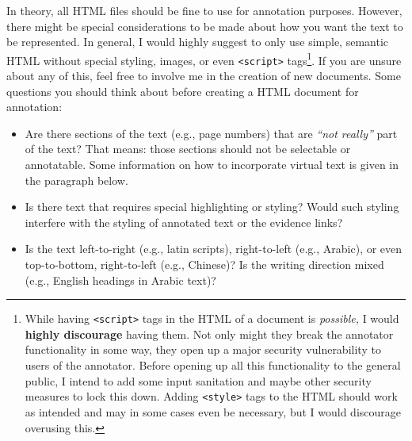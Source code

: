 In theory, all HTML files should be fine to use for annotation purposes.
However, there might be special considerations to be made about how you want the text to be represented.
In general, I would highly suggest to only use simple, semantic HTML without special styling, images, or even \verb!<script>! tags\footnote{
  While having \texttt{<script>} tags in the HTML of a document is \emph{possible,} I would \textbf{highly discourage} having them.
  Not only might they break the annotator functionality in some way, they open up a major security vulnerability to users of the annotator.
  Before opening up all this functionality to the general public, I intend to add some input sanitation and maybe other security measures to lock this down.
  Adding \texttt{<style>} tags to the HTML should work as intended and may in some cases even be necessary, but I would discourage overusing this.
}.
If you are unsure about any of this, feel free to involve me in the creation of new documents.
Some questions you should think about before creating a HTML document for annotation:

\begin{itemize}
  \item
    Are there sections of the text (e.g., page numbers) that are \emph{\enquote{not really}} part of the text?
    That means: those sections should not be selectable or annotatable.
    Some information on how to incorporate virtual text is given in the paragraph below.
  \item
    Is there text that requires special highlighting or styling?
    Would such styling interfere with the styling of annotated text or the evidence links?
  \item
    Is the text left-to-right (e.g., latin scripts), right-to-left (e.g., Arabic), or even top-to-bottom, right-to-left (e.g., Chinese)?
    Is the writing direction mixed (e.g., English headings in Arabic text)?
\end{itemize}

